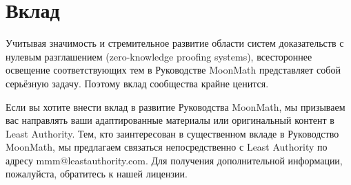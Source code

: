 \section{Вклад}Учитывая значимость и стремительное развитие области систем доказательств с нулевым разглашением (zero-knowledge proofing systems), всестороннее освещение соответствующих тем в Руководстве MoonMath представляет собой серьёзную задачу. Поэтому вклад сообщества крайне ценится.

Если вы хотите внести вклад в развитие Руководства MoonMath, мы призываем вас направлять ваши адаптированные материалы или оригинальный контент в Least Authority. Тем, кто заинтересован в существенном вкладе в Руководство MoonMath, мы предлагаем связаться непосредственно с Least Authority по адресу mmm@leastauthority.com. Для получения дополнительной информации, пожалуйста, обратитесь к нашей лицензии.


